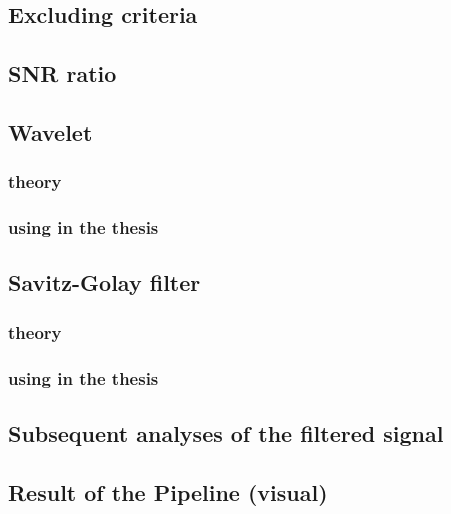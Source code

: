 \subsection{Excluding criteria}
\subsection{SNR ratio}
\subsection{Wavelet}
\subsubsection{theory}
\subsubsection{using in the thesis}
\subsection{Savitz-Golay filter}
\subsubsection{theory}
\subsubsection{using in the thesis}
\subsection{Subsequent analyses of the filtered signal}
\subsection{Result of the Pipeline (visual)}
